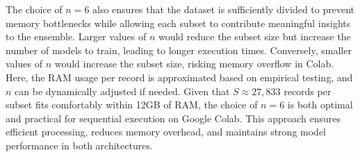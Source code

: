 \vspace{1em}

\noindent
The choice of \( n = 6 \) also ensures that the dataset is sufficiently divided to prevent memory bottlenecks while allowing each subset to contribute meaningful insights to the ensemble. Larger values of \( n \) would reduce the subset size but increase the number of models to train, leading to longer execution times. Conversely, smaller values of \( n \) would increase the subset size, risking memory overflow in Colab. Here, the RAM usage per record is approximated based on empirical testing, and \( n \) can be dynamically adjusted if needed. Given that \( S \approx 27,833 \) records per subset fits comfortably within 12GB of RAM, the choice of \( n = 6 \) is both optimal and practical for sequential execution on Google Colab. This approach ensures efficient processing, reduces memory overhead, and maintains strong model performance in both architectures.


\pagebreak

